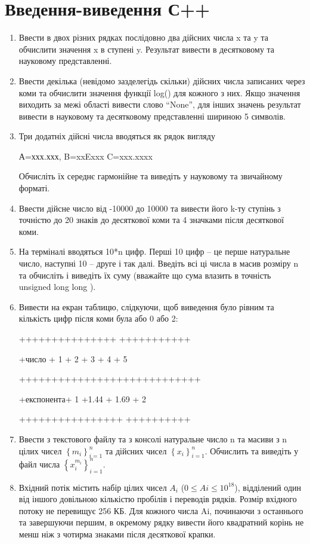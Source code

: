 \documentclass[]{article}
\begin{document}
\section {Введення-виведення С++}
\begin{enumerate}
\item
Ввести в двох різних рядках
послідовно два дійсних числа x та y та обчислити значення x в ступені y.
Результат вивести в десятковому та науковому представленні.

\item Ввести декілька (невідомо
зазделегідь скільки) дійсних числа записаних через коми та обчислити
значення функції log() для кожного з них. Якщо значення виходить за межі
області вивести слово ``None'', для інших значень результат вивести в
науковому та десятковому представленні шириною 5 символів.
\item
Три додатніх дійсні числа вводяться як рядок вигляду

А=ххх.ххх, B=xxExxx C=xxx.xxxx

Обчисліть їх середнє гармонійне та виведіть у науковому та звичайному
форматі.

\item
Ввести дійсне число від -10000 до 10000 та вивести його k-ту ступінь з
точністю до 20 знаків до десяткової коми та 4 значками після десяткової
коми.

\item
На терміналі вводяться 10*n цифр.
Перші 10 цифр -- це перше натуральне число, наступні 10 -- друге і так
далі. Введіть всі ці числа в масив розміру n та обчисліть і виведіть їх
суму (вважайте що сума влазить в точність unsigned long long ).

\item
Вивести на екран таблицю, слідкуючи, щоб виведення було рівним та
кількість цифр після коми була або 0 або 2:

+++++++++++++++ +++++++++++

+число + 1 + 2 + 3 + 4 + 5

++++++++++++++++++++++++++++

+експонента+ 1 +1.44 + 1.69 + 2

++++++++++++++++ ++++++++++

\item
Ввести з текстового файлу та з консолі натуральне число n та масиви з n
цілих чисел \(\left\{ m_{i} \right\}_{i = 1}^{n}\) та дійсних чисел
\(\left\{ x_{i} \right\}_{i = 1}^{n}\). Обчислить та виведіть у файл
числа \(\left\{ x_{i}^{m_{i}} \right\}_{i = 1}^{n}\).
\item
Вхідний потік містить набір цілих
чисел $A_i$ ($0 \le Ai \le 10^{18}$), відділений один від іншого
довільною кількістю пробілів і переводів рядків. Розмір вхідного потоку
не перевищує 256 КБ. Для кожного числа Ai, починаючи з останнього та
завершуючи першим, в окремому рядку вивести його квадратний корінь не
менш ніж з чотирма знаками після десяткової крапки.


\end{enumerate}
\end{document}
